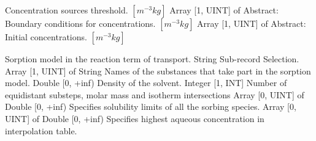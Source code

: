 \begin{RecordType}
			{} %
			{{{Concentration sources threshold. }{$[m^{-3}kg]$}}}
		\KeyItem
			{}
			{{Array [1, UINT] of }{Abstract}{: }}
			{\textrangle}
			{} %
			{{{Boundary conditions for concentrations. }{$[m^{-3}kg]$}}}
		\KeyItem
			{}
			{{Array [1, UINT] of }{Abstract}{: }}
			{\textrangle}
			{} %
			{{{Initial concentrations. }{$[m^{-3}kg]$}}}
\end{RecordType}
\begin{RecordType}
	{}
	{} %
	{} %
	{} %
	{{{Sorption model in the reaction term of transport.}}}
		\KeyItem
			{}
			{{String}}
			{\textrangle}
			{} %
			{{{Sub-record Selection.}}}
		\KeyItem
			{}
			{{Array [1, UINT] of }{String}}
			{\textrangle}
			{} %
			{{{Names of the substances that take part in the sorption model.}}}
		\KeyItem
			{}
			{{Double [0, +inf)}}
			{\textrangle}
			{} %
			{{{Density of the solvent.}}}
		\KeyItem
			{}
			{{Integer [1, INT]}}
			{\textrangle}
			{} %
			{{{Number of equidistant substeps, molar mass and isotherm intersections}}}
		\KeyItem
			{}
			{{Array [0, UINT] of }{Double [0, +inf)}}
			{\textrangle}
			{} %
			{{{Specifies solubility limits of all the sorbing species.}}}
		\KeyItem
			{}
			{{Array [0, UINT] of }{Double [0, +inf)}}
			{\textrangle}
			{} %
			{{{Specifies highest aqueous concentration in interpolation table.}}}
		\KeyItem
			{}

\end{RecordType}
